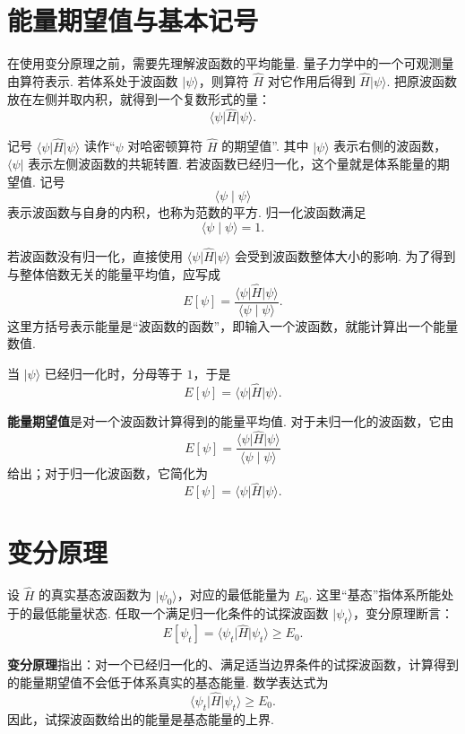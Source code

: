 \documentclass[UTF8,11pt,a4paper,openany]{ctexbook}
\newcommand{\ket}[1]{\lvert #1\rangle}\newcommand{\bra}[1]{\langle #1\rvert}
\newcommand{\braket}[2]{\langle #1\mid #2\rangle}\newcommand{\ii}{\mathrm i}
\newcommand{\term}[1]{\textbf{#1}}
\begin{document}
\section{能量期望值与基本记号}

在使用变分原理之前，需要先理解波函数的平均能量. 量子力学中的一个可观测量由算符表示. 若体系处于波函数 $\ket{\psi}$，则算符 $\hat H$ 对它作用后得到 $\hat H\ket{\psi}$. 把原波函数放在左侧并取内积，就得到一个复数形式的量：
\[
\bra{\psi}\hat H\ket{\psi}.
\]

\begin{notationbox}
记号 $\bra{\psi}\hat H\ket{\psi}$ 读作“$\psi$ 对哈密顿算符 $\hat H$ 的期望值”. 其中 $\ket{\psi}$ 表示右侧的波函数，$\bra{\psi}$ 表示左侧波函数的共轭转置. 若波函数已经归一化，这个量就是体系能量的期望值. 记号
\[
\braket{\psi}{\psi}
\]
表示波函数与自身的内积，也称为范数的平方. 归一化波函数满足
\[
\braket{\psi}{\psi}=1.
\]
\end{notationbox}

若波函数没有归一化，直接使用 $\bra{\psi}\hat H\ket{\psi}$ 会受到波函数整体大小的影响. 为了得到与整体倍数无关的能量平均值，应写成
\[
E[\psi]=
\frac{\bra{\psi}\hat H\ket{\psi}}
{\braket{\psi}{\psi}}.
\]
这里方括号表示能量是“波函数的函数”，即输入一个波函数，就能计算出一个能量数值. 

当 $\ket{\psi}$ 已经归一化时，分母等于 $1$，于是
\[
E[\psi]=\bra{\psi}\hat H\ket{\psi}.
\]

\begin{definitionbox}
\term{能量期望值}是对一个波函数计算得到的能量平均值. 对于未归一化的波函数，它由
\[
E[\psi]=
\frac{\bra{\psi}\hat H\ket{\psi}}
{\braket{\psi}{\psi}}
\]
给出；对于归一化波函数，它简化为
\[
E[\psi]=\bra{\psi}\hat H\ket{\psi}.
\]
\end{definitionbox}

\section{变分原理}

设 $\hat H$ 的真实基态波函数为 $\ket{\psi_0}$，对应的最低能量为 $E_0$. 这里“基态”指体系所能处于的最低能量状态. 任取一个满足归一化条件的试探波函数 $\ket{\psi_t}$，变分原理断言：
\[
E[\psi_t]
=
\bra{\psi_t}\hat H\ket{\psi_t}
\geq E_0.
\]

\begin{definitionbox}
\term{变分原理}指出：对一个已经归一化的、满足适当边界条件的试探波函数，计算得到的能量期望值不会低于体系真实的基态能量. 数学表达式为
\[
\bra{\psi_t}\hat H\ket{\psi_t}\geq E_0.
\]
因此，试探波函数给出的能量是基态能量的上界. 
\end{definitionbox}
\end{document}
